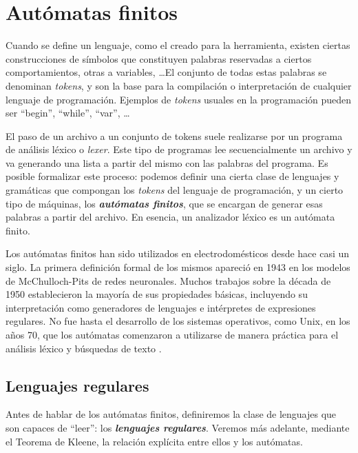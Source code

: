 
\chapter{Autómatas finitos}\label{chap:AF}

Cuando se define un lenguaje, como el creado para la herramienta, existen ciertas construcciones de símbolos que
constituyen palabras reservadas a ciertos comportamientos, otras a variables, \dots El conjunto de todas estas palabras
se denominan \textit{tokens}, y son la base para la compilación o interpretación de cualquier lenguaje de programación.
Ejemplos de \textit{tokens} usuales en la programación pueden ser ``begin'', ``while'', ``var'', \dots

\vspace{10pt}
El paso de un archivo a un conjunto de tokens suele realizarse por un programa de análisis léxico o \textit{lexer}. 
Este tipo de programas lee secuencialmente un archivo y va generando una lista a partir del mismo con las palabras del
programa. Es posible formalizar este proceso: podemos definir una cierta clase de lenguajes y gramáticas que compongan
los \textit{tokens} del lenguaje de programación, y un cierto tipo de máquinas, los 
\textbf{\textit{autómatas finitos}}, que se encargan de generar esas palabras a partir del archivo. En esencia, un
analizador léxico es un autómata finito.

\vspace{10pt}
Los autómatas finitos han sido utilizados en electrodomésticos desde hace casi un siglo. La primera definición formal
de los mismos apareció en 1943 en los modelos de McChulloch-Pits de redes neuronales. Muchos trabajos sobre la década
de 1950 establecieron la mayoría de sus propiedades básicas, incluyendo su interpretación como generadores de lenguajes 
e intérpretes de expresiones regulares. No fue hasta el desarrollo de los sistemas operativos, como Unix, en los años 
70, que los autómatas comenzaron a utilizarse de manera práctica para el análisis léxico y búsquedas de texto 
\cite{wolfram_2018}.

\section{Lenguajes regulares}

Antes de hablar de los autómatas finitos, definiremos la clase de lenguajes que son capaces de ``leer'': los
\textbf{\textit{lenguajes regulares}}. Veremos más adelante, mediante el Teorema de Kleene, la relación explícita entre
ellos y los autómatas.


